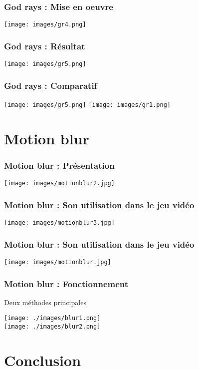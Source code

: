 \documentclass[10pt]{beamer}
\begin{document}
\begin{frame}
	\frametitle{God rays : Mise en oeuvre}
    \centering
    \texttt{[image: images/gr4.png]}
\end{frame}

\begin{frame}
	\frametitle{God rays : Résultat}
    \centering
    \texttt{[image: images/gr5.png]}
\end{frame}

\begin{frame}
	\frametitle{God rays : Comparatif}
    \centering
    \texttt{[image: images/gr5.png]}
    \vspace{0.5cm}
    \texttt{[image: images/gr1.png]}
\end{frame}

\section{Motion blur}

\begin{frame}
	\frametitle{Motion blur : Présentation}
    \centering
    \texttt{[image: images/motionblur2.jpg]}
\end{frame}


\begin{frame}
	\frametitle{Motion blur : Son utilisation dans le jeu vidéo}
    \centering
    \texttt{[image: images/motionblur3.jpg]}
\end{frame}

\begin{frame}
	\frametitle{Motion blur : Son utilisation dans le jeu vidéo}
    \centering
    \texttt{[image: images/motionblur.jpg]}
\end{frame}

\begin{frame}
	\frametitle{Motion blur : Fonctionnement}
    Deux méthodes principales\pause
    \begin{center}
	\texttt{[image: ./images/blur1.png]}\\\pause
	\texttt{[image: ./images/blur2.png]}
	\end{center}
\end{frame}

\section{Conclusion}
\end{document}
